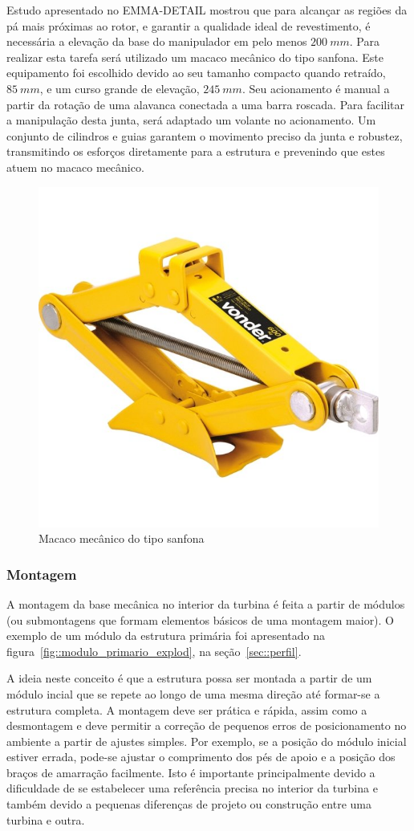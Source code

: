 Estudo apresentado no EMMA-DETAIL mostrou que para alcançar as regiões da pá
mais próximas ao rotor, e garantir a qualidade ideal de revestimento, é
necessária a elevação da base do manipulador em pelo menos $200~mm$.
Para realizar esta tarefa será utilizado um macaco mecânico do tipo sanfona.
Este equipamento foi escolhido devido ao seu tamanho compacto quando retraído,
$85~mm$, e um curso grande de elevação, $245~mm$. Seu acionamento é manual a
partir da rotação de uma alavanca conectada a uma barra roscada.
Para facilitar a manipulação desta junta, será adaptado um volante no
acionamento.
Um conjunto de cilindros e guias garantem o movimento preciso da junta e
robustez, transmitindo os esforços diretamente para a estrutura e prevenindo que
estes atuem no macaco mecânico.

\begin{figure}[h!]
	\centering
	\includegraphics[width=0.6\columnwidth]{figs/construcao/macaco_sanfona}
	\caption{Macaco mecânico do tipo sanfona}
    \label{fig::macaco_sanfona}
\end{figure}

\subsubsection{Montagem}

A montagem da base mecânica no interior da turbina é feita a partir de módulos
(ou submontagens que formam elementos básicos de uma montagem maior). O exemplo
de um módulo da estrutura primária foi apresentado na
figura~\ref{fig::modulo_primario_explod}, na seção~\ref{sec::perfil}. 

A ideia neste conceito é que a estrutura possa ser montada a partir de um módulo
incial que se repete ao longo de uma mesma direção até formar-se a estrutura
completa. A montagem deve ser prática e rápida, assim como a desmontagem e
deve permitir a correção de pequenos erros de posicionamento no
ambiente a partir de ajustes simples. Por exemplo, se a posição do módulo
inicial estiver errada, pode-se ajustar o comprimento dos pés de apoio e a
posição dos braços de amarração facilmente. Isto é importante principalmente
devido a dificuldade de se estabelecer uma referência precisa no interior da
turbina e também devido a pequenas diferenças de projeto ou construção entre uma
turbina e outra.



